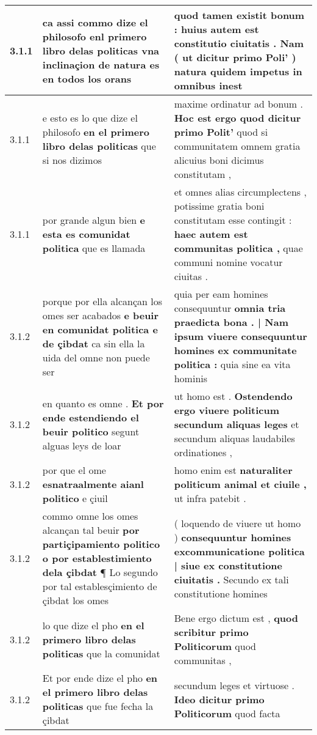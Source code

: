 \begin{tabular}{|p{1cm}|p{6.5cm}|p{6.5cm}|}
3.1.1 & ca assi commo dize el philosofo \textbf{ enl primero libro delas politicas } vna inclinaçion de natura es en todos los orans & quod tamen existit bonum : \textbf{ huius autem est constitutio ciuitatis . Nam ( ut dicitur primo Poli’ ) } natura quidem impetus in omnibus inest \\\hline
3.1.1 & e esto es lo que dize el philosofo \textbf{ en el primero libro delas politicas } que si nos dizimos & maxime ordinatur ad bonum . \textbf{ Hoc est ergo quod dicitur primo Polit’ } quod si communitatem omnem gratia alicuius boni dicimus constitutam , \\\hline
3.1.1 & por grande algun bien \textbf{ e esta es comunidat politica } que es llamada & et omnes alias circumplectens , potissime gratia boni constitutam esse contingit : \textbf{ haec autem est communitas politica , } quae communi nomine vocatur ciuitas . \\\hline
3.1.2 & porque por ella alcançan los omes ser acabados \textbf{ e beuir en comunidat politica e de çibdat } ca sin ella la uida del omne non puede ser & quia per eam homines consequuntur \textbf{ omnia tria praedicta bona . | Nam ipsum viuere consequuntur homines ex communitate politica : } quia sine ea vita hominis \\\hline
3.1.2 & en quanto es omne . \textbf{ Et por ende estendiendo el beuir politico } segunt alguas leys de loar & ut homo est . \textbf{ Ostendendo ergo viuere politicum secundum aliquas leges } et secundum aliquas laudabiles ordinationes , \\\hline
3.1.2 & por que el ome \textbf{ esnatraalmente aianl politico } e çiuil & homo enim est \textbf{ naturaliter politicum animal et ciuile , } ut infra patebit . \\\hline
3.1.2 & commo omne los omes alcançan tal beuir \textbf{ por partiçipamiento politico o por establestimiento dela çibdat } ¶ Lo segundo por tal establesçimiento de çibdat los omes & ( loquendo de viuere ut homo ) \textbf{ consequuntur homines excommunicatione politica | siue ex constitutione ciuitatis . } Secundo ex tali constitutione homines \\\hline
3.1.2 & lo que dize el pho \textbf{ en el primero libro delas politicas } que la comunidat & Bene ergo dictum est , \textbf{ quod scribitur primo Politicorum } quod communitas , \\\hline
3.1.2 & Et por ende dize el pho \textbf{ en el primero libro delas politicas } que fue fecha la çibdat & secundum leges et virtuose . \textbf{ Ideo dicitur primo Politicorum } quod facta \\\hline

\end{tabular}
